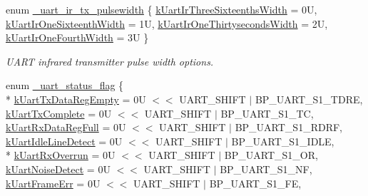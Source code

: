 \begin{DoxyCompactItemize}
\item 
enum \hyperlink{group__uart__hal_ga9bf0284b094edf04f6b91db68f20ed7d}{\+\_\+uart\+\_\+ir\+\_\+tx\+\_\+pulsewidth} \{ \hyperlink{group__uart__hal_gga9bf0284b094edf04f6b91db68f20ed7dabc3065fe188c6498365f33b40db32414}{k\+Uart\+Ir\+Three\+Sixteenths\+Width} = 0U, 
\hyperlink{group__uart__hal_gga9bf0284b094edf04f6b91db68f20ed7da4af56197dd644086548f53f873add6c2}{k\+Uart\+Ir\+One\+Sixteenth\+Width} = 1U, 
\hyperlink{group__uart__hal_gga9bf0284b094edf04f6b91db68f20ed7dadd2e9d00bfb3c194fabc51fc0cbb85d4}{k\+Uart\+Ir\+One\+Thirtyseconds\+Width} = 2U, 
\hyperlink{group__uart__hal_gga9bf0284b094edf04f6b91db68f20ed7da43b6f8056ad9cef47393f120e741a590}{k\+Uart\+Ir\+One\+Fourth\+Width} = 3U
 \}\begin{DoxyCompactList}\small\item\em U\+A\+RT infrared transmitter pulse width options. \end{DoxyCompactList}
\item 
enum \hyperlink{group__uart__hal_gaa4ec9f908b1b8e958c99ddff14373882}{\+\_\+uart\+\_\+status\+\_\+flag} \{ \\*
\hyperlink{group__uart__hal_ggaa4ec9f908b1b8e958c99ddff14373882aa64266a26f7484bf13f166f5748f59f1}{k\+Uart\+Tx\+Data\+Reg\+Empty} = 0U $<$$<$ U\+A\+R\+T\+\_\+\+S\+H\+I\+FT $\vert$ B\+P\+\_\+\+U\+A\+R\+T\+\_\+\+S1\+\_\+\+T\+D\+RE, 
\hyperlink{group__uart__hal_ggaa4ec9f908b1b8e958c99ddff14373882a279387cdd7ef50baa10a884958b4167e}{k\+Uart\+Tx\+Complete} = 0U $<$$<$ U\+A\+R\+T\+\_\+\+S\+H\+I\+FT $\vert$ B\+P\+\_\+\+U\+A\+R\+T\+\_\+\+S1\+\_\+\+TC, 
\hyperlink{group__uart__hal_ggaa4ec9f908b1b8e958c99ddff14373882a51209510afba63ec18ff6d4b2568696b}{k\+Uart\+Rx\+Data\+Reg\+Full} = 0U $<$$<$ U\+A\+R\+T\+\_\+\+S\+H\+I\+FT $\vert$ B\+P\+\_\+\+U\+A\+R\+T\+\_\+\+S1\+\_\+\+R\+D\+RF, 
\hyperlink{group__uart__hal_ggaa4ec9f908b1b8e958c99ddff14373882a6501d94c6320621bfc570529de6f7441}{k\+Uart\+Idle\+Line\+Detect} = 0U $<$$<$ U\+A\+R\+T\+\_\+\+S\+H\+I\+FT $\vert$ B\+P\+\_\+\+U\+A\+R\+T\+\_\+\+S1\+\_\+\+I\+D\+LE, 
\\*
\hyperlink{group__uart__hal_ggaa4ec9f908b1b8e958c99ddff14373882a218febaed0bb1045e42432024dd992d9}{k\+Uart\+Rx\+Overrun} = 0U $<$$<$ U\+A\+R\+T\+\_\+\+S\+H\+I\+FT $\vert$ B\+P\+\_\+\+U\+A\+R\+T\+\_\+\+S1\+\_\+\+OR, 
\hyperlink{group__uart__hal_ggaa4ec9f908b1b8e958c99ddff14373882acfbb3038b0b81022de7d3600fd0a3255}{k\+Uart\+Noise\+Detect} = 0U $<$$<$ U\+A\+R\+T\+\_\+\+S\+H\+I\+FT $\vert$ B\+P\+\_\+\+U\+A\+R\+T\+\_\+\+S1\+\_\+\+NF, 
\hyperlink{group__uart__hal_ggaa4ec9f908b1b8e958c99ddff14373882a3d96d49ccbc30ad8a7cae0ff64a7c8ff}{k\+Uart\+Frame\+Err} = 0U $<$$<$ U\+A\+R\+T\+\_\+\+S\+H\+I\+FT $\vert$ B\+P\+\_\+\+U\+A\+R\+T\+\_\+\+S1\+\_\+\+FE, 
$$
\end{DoxyCompactItemize}
